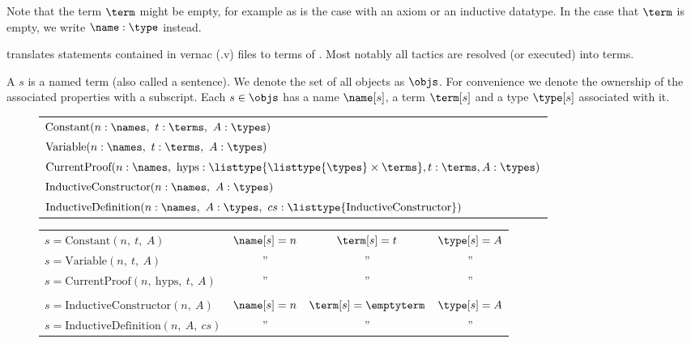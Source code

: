 Note that the term $\term$ might be empty, for example as is the case with an axiom or an inductive datatype.
In the case that $\term$ is empty, we write $\name : \type$ instead.

\coq translates \gallina statements contained in \coq vernac (.v) files to terms of \pcic.
Most notably all tactics are resolved (or executed) into terms.

\begin{definition}[{\coqobj[s]}]
	A \coqobj $s$ is a named \pcic term (also called a sentence).
	We denote the set of all \coq objects as $\objs$.
	For convenience we denote the ownership of the associated properties with a subscript.
	Each \coqobj $s \in \objs$ has a name $\name[s]$,
	a term $\term[s]$ and a type $\type[s]$ associated with it.

	\begin{figure}[H]
		\centering
		\begin{tabular}{l}
			$\text{Constant}(n:\names,~ t:\terms,~ A:\types)$ \\
			$\text{Variable}(n:\names,~ t:\terms,~ A:\types)$ \\
			$\text{CurrentProof}(n:\names,~ \text{hyps}:\listtype{\listtype{\types} \times \terms}, t:\terms, A:\types)$ \\
			$\text{InductiveConstructor}(n:\names,~ A:\types)$ \\
			$\text{InductiveDefinition}(n:\names,~ A:\types,~ cs:\listtype{\text{InductiveConstructor}})$
		\end{tabular}
	\end{figure}

	\begin{figure}[H]
		\centering
		\begin{tabular}{lccc}
			$s = \text{Constant}(n,~ t,~ A)$ & $\name[s] = n$ & $\term[s] = t$ & $\type[s] = A$ \\
			$s = \text{Variable}(n,~ t,~ A)$ & '' & '' & '' \\
			$s = \text{CurrentProof}(n,~ \text{hyps},~ t,~ A)$ & '' & '' & '' \\
			 & & & \\
			$s = \text{InductiveConstructor}(n,~ A)$ & $\name[s] = n$ & $\term[s] = \emptyterm$ & $\type[s] = A$ \\
			$s = \text{InductiveDefinition}(n,~ A,~ cs)$ & '' & '' & ''
		\end{tabular}
	\end{figure}
\end{definition}

